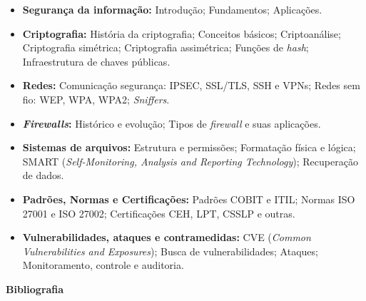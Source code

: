 \begin{itemize}

\item \textbf{Segurança da informação:}
    Introdução; Fundamentos; Aplicações.

\item \textbf{Criptografia:}
    História da criptografia;
    Conceitos básicos;
    Criptoanálise;
    Criptografia simétrica;
    Criptografia assimétrica;
    Funções de \textit{hash};
    Infraestrutura de chaves públicas.

\item \textbf{Redes:}
    Comunicação segurança: IPSEC, SSL/TLS, SSH e VPNs;
    Redes sem fio: WEP, WPA, WPA2;
    \textit{Sniffers}.

\item \textbf{\textit{Firewalls}:}
    Histórico e evolução;
    Tipos de \textit{firewall} e suas aplicações.

\item \textbf{Sistemas de arquivos:}
    Estrutura e permissões;
    Formatação física e lógica;
    SMART (\textit{Self-Monitoring, Analysis and Reporting Technology});
    Recuperação de dados.

\item \textbf{Padrões, Normas e Certificações:}
    Padrões       COBIT e ITIL;
    Normas        ISO 27001 e ISO 27002;
    Certificações CEH, LPT, CSSLP e outras.

\item \textbf{Vulnerabilidades, ataques e contramedidas:}
    CVE (\textit{Common Vulnerabilities and Exposures});
    Busca de vulnerabilidades;
    Ataques;
    Monitoramento, controle e auditoria.

\end{itemize}


%
%
%


\begin{snugshade}\begin{center}\textbf{
    Bibliografia
}\end{center}\end{snugshade}

